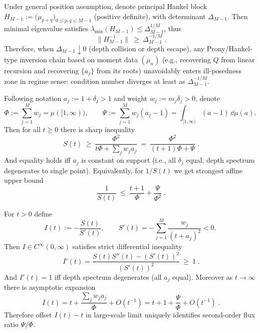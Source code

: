 \begin{proposition}
Under general position assumption, denote principal Hankel block
\(
H_{M-1}:=\bigl(\mu_{p+q}\bigr)_{0\le p,q\le M-1}
\)
(positive definite), with determinant \(\Delta_{M-1}\).
Then minimal eigenvalue satisfies \(\lambda_{\min}(H_{M-1})\le \Delta_{M-1}^{1/M}\), thus
\[
\boxed{\;
\|H_{M-1}^{-1}\|\ \ge\ \Delta_{M-1}^{-1/M}\; }.
\]
Therefore, when \(\Delta_{M-1}\downarrow 0\) (depth collision or depth escape), any Prony/Hankel-type inversion chain based on moment data \((\mu_n)\) (e.g., recovering \(Q\) from linear recursion and recovering \(\{a_j\}\) from its roots) unavoidably enters ill-posedness zone in regime sense: condition number diverges at least as \(\Delta_{M-1}^{-1/M}\).
\end{proposition}

\begin{proposition}
Following notation \(a_j:=1+\delta_j>1\) and weight \(w_j:=m_j\delta_j>0\), denote
\[
\Phi:=\sum_{j=1}^{M}w_j=\mu([1,\infty)),
\qquad
\Psi:=\sum_{j=1}^{M}w_j(a_j-1)=\int_{[1,\infty)}(a-1)\,\dd\mu(a).
\]
Then for all \(t\ge 0\) there is sharp inequality
\[
\boxed{\;
S(t)\ \ge\ \frac{\Phi^2}{t\Phi+\sum_{j}w_j a_j}
\ =\ \frac{\Phi^2}{(t+1)\Phi+\Psi}\; }.
\]
And equality holds iff \(a_j\) is constant on support (i.e., all \(\delta_j\) equal, depth spectrum degenerates to single point).
Equivalently, for \(1/S(t)\) we get strongest affine upper bound
\[
\boxed{\;
\frac{1}{S(t)}\ \le\ \frac{t+1}{\Phi}+\frac{\Psi}{\Phi^2}\; }.
\]
\end{proposition}

\begin{proposition}[Superlinearity of Effective Scale Function: Monotonicity and Limit Moment Identification of \texorpdfstring{$I(t):=-S(t)/S'(t)$}{I(t)}]
For \(t>0\) define
\[
I(t):=-\frac{S(t)}{S'(t)},
\qquad
S'(t)=-\sum_{j=1}^{M}\frac{w_j}{(t+a_j)^2}<0.
\]
Then \(I\in C^\infty(0,\infty)\) satisfies strict differential inequality
\[
\boxed{\;
I'(t)=\frac{S(t)S''(t)-(S'(t))^2}{(S'(t))^2}\ \ge\ 1\; }.
\]
And \(I'(t)=1\) iff depth spectrum degenerates (all \(a_j\) equal).
Moreover as \(t\to\infty\) there is asymptotic expansion
\[
\boxed{\;
I(t)=t+\frac{\sum_{j}w_j a_j}{\Phi}+O(t^{-1})
=t+1+\frac{\Psi}{\Phi}+O(t^{-1})\; }.
\]
Therefore offset \(I(t)-t\) in large-scale limit uniquely identifies second-order flux ratio \(\Psi/\Phi\).
\end{proposition}

